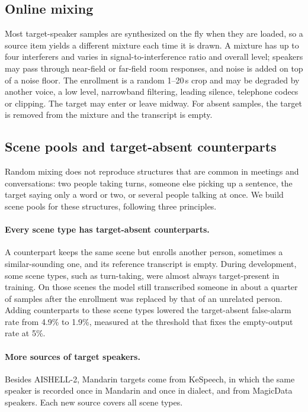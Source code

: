 \subsection{Online mixing}
\label{subsec:data_mixing}

Most target-speaker samples are synthesized on the fly when they are loaded, so a source item yields a different mixture each time it is drawn.
A mixture has up to four interferers and varies in signal-to-interference ratio and overall level; speakers may pass through near-field or far-field room responses, and noise is added on top of a noise floor.
The enrollment is a random 1--20\,s crop and may be degraded by another voice, a low level, narrowband filtering, leading silence, telephone codecs or clipping.
The target may enter or leave midway.
For absent samples, the target is removed from the mixture and the transcript is empty.

\subsection{Scene pools and target-absent counterparts}
\label{subsec:data_scenes}

Random mixing does not reproduce structures that are common in meetings and conversations: two people taking turns, someone else picking up a sentence, the target saying only a word or two, or several people talking at once.
We build scene pools for these structures, following three principles.

\paragraph{Every scene type has target-absent counterparts.}
A counterpart keeps the same scene but enrolls another person, sometimes a similar-sounding one, and its reference transcript is empty.
During development, some scene types, such as turn-taking, were almost always target-present in training.
On those scenes the model still transcribed someone in about a quarter of samples after the enrollment was replaced by that of an unrelated person.
Adding counterparts to these scene types lowered the target-absent false-alarm rate from 4.9\% to 1.9\%, measured at the threshold that fixes the empty-output rate at 5\%.

\paragraph{More sources of target speakers.}
Besides AISHELL-2, Mandarin targets come from KeSpeech, in which the same speaker is recorded once in Mandarin and once in dialect, and from MagicData speakers.
Each new source covers all scene types.

